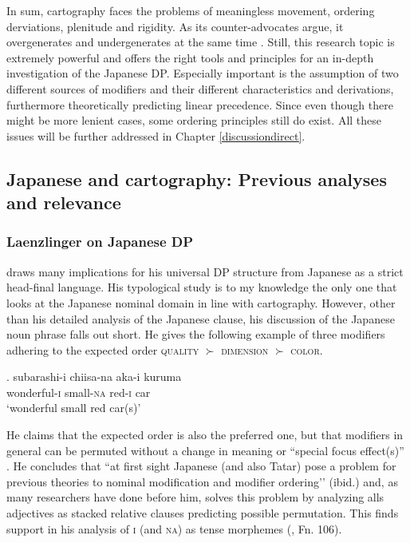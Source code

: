 \documentclass [output=book,colorlinks,citecolor=brown]{langscibook}
\begin{document}
In sum, cartography faces the problems of meaningless movement, ordering derviations, plenitude and rigidity. As its counter-advocates argue, it overgenerates and undergenerates at the same time \citep{larson:2021:rethinking, manzini:2025:left}. Still, this research topic is extremely powerful and offers the right tools and principles for an in-depth investigation of the Japanese DP. Especially important is the assumption of two different sources of modifiers and their different characteristics and derivations, furthermore theoretically predicting linear precedence. Since even though there might be more lenient cases, some ordering principles still do exist. All these issues will be further addressed in Chapter \ref{discussiondirect}.

\subsection{Japanese and cartography: Previous analyses and relevance}

\subsubsection{Laenzlinger on Japanese DP} \label{Laenz}

\citet{laenzlinger:2010:cp, laenzlinger:2011:elements} draws many implications for his universal DP structure from Japanese as a strict head-final language. His typological study is to my knowledge the only one that looks at the Japanese nominal domain in line with cartography. However, other than his detailed analysis of the Japanese clause, his discussion of the Japanese noun phrase falls out short. He gives the following example of three modifiers adhering to the expected order \textsc{quality} $\succ$ \textsc{dimension} $\succ$ \textsc{color}.

\exg. \label{chiisa}subarashi-i chiisa-na aka-i kuruma \\
wonderful-\textsc{i} small-\textsc{na} red-\textsc{i} car\\
`wonderful small red car(s)’ \hfill \citep[189]{laenzlinger:2011:elements}

He claims that the expected order is also the preferred one, but that modifiers in general can be permuted without a change in meaning or ``special focus effect(s)” \citep[190]{laenzlinger:2011:elements}. He concludes that ``at first sight Japanese (and also Tatar) pose a problem for previous theories to nominal modification and modifier ordering’’ (ibid.) and, as many researchers have done before him, solves this problem by analyzing alls adjectives as stacked relative clauses predicting possible permutation. This finds support in his analysis of \textsc{i} (and \textsc{na}) as tense morphemes (\citealt[191]{laenzlinger:2011:elements}, Fn. 106). %
\end{document}
